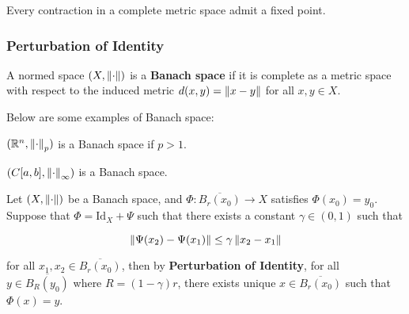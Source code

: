 \documentclass[a4paper,12pt]{article}
\begin{document}
\begin{thm}
  Every contraction in a complete metric space admit a fixed point.
\end{thm}

\subsubsection{Perturbation of Identity}
\begin{dft}
  A normed space $(X,\left\| \cdot\right\|)$ is a \textbf{Banach space} if it is complete as a metric space with respect to the induced metric $d(x,y)=\left\| x-y\right\|$ for all $x,y\in X$.
\end{dft}

\begin{exm}
  Below are some examples of Banach space:

  \begin{alist}
    \item $(\mathbb{R}^{n},\left\| \cdot\right\|_{p})$ is a Banach space if $p>1$.
    \item $(C[a,b],\left\| \cdot\right\|_{\infty})$ is a Banach space.
  \end{alist}
\end{exm}

\begin{thm}
  Let $(X,\left\| \cdot\right\|)$ be a Banach space, and $\Phi:\overline{B_{r}(x_{0})}\to X$ satisfies $\Phi(x_{0})=y_{0}$. Suppose that $\Phi=\mathrm{Id}_{X}+\Psi$ such that there exists a constant $\gamma\in(0,1)$ such that

  $$\left\| \Psi(x_{2})-\Psi(x_{1})\right\|\leq\gamma\left\| x_{2}-x_{1}\right\|$$\s

  for all $x_{1},x_{2}\in\overline{B_{r}(x_{0})}$, then by \textbf{Perturbation of Identity}, for all $y\in\overline{B_{R}(y_{0})}$ where $R=(1-\gamma)r$, there exists unique $x\in\overline{B_{r}(x_{0})}$ such that $\Phi(x)=y$.
\end{thm}
\end{document}
